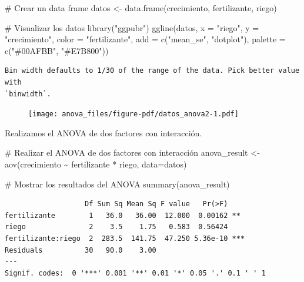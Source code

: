 \documentclass[
  letterpaper,
  DIV=11,
  numbers=noendperiod]{scrreprt}
\newenvironment{Shaded}{\begin{snugshade}}{\end{snugshade}}
\newcommand{\AttributeTok}[1]{\textcolor[rgb]{0.40,0.45,0.13}{#1}}
\newcommand{\CommentTok}[1]{\textcolor[rgb]{0.37,0.37,0.37}{#1}}
\newcommand{\FunctionTok}[1]{\textcolor[rgb]{0.28,0.35,0.67}{#1}}
\newcommand{\NormalTok}[1]{\textcolor[rgb]{0.00,0.23,0.31}{#1}}
\newcommand{\OtherTok}[1]{\textcolor[rgb]{0.00,0.23,0.31}{#1}}
\newcommand{\SpecialCharTok}[1]{\textcolor[rgb]{0.37,0.37,0.37}{#1}}
\newcommand{\StringTok}[1]{\textcolor[rgb]{0.13,0.47,0.30}{#1}}
\begin{document}
\begin{tcolorbox}
\begin{Shaded}
\begin{Highlighting}[]
\CommentTok{\# Crear un data frame}
\NormalTok{datos }\OtherTok{\textless{}{-}} \FunctionTok{data.frame}\NormalTok{(crecimiento, fertilizante, riego)}

\CommentTok{\# Visualizar los datos}
\FunctionTok{library}\NormalTok{(}\StringTok{"ggpubr"}\NormalTok{)}
\FunctionTok{ggline}\NormalTok{(datos, }\AttributeTok{x =} \StringTok{"riego"}\NormalTok{, }\AttributeTok{y =} \StringTok{"crecimiento"}\NormalTok{, }\AttributeTok{color =} \StringTok{"fertilizante"}\NormalTok{,}
       \AttributeTok{add =} \FunctionTok{c}\NormalTok{(}\StringTok{"mean\_se"}\NormalTok{, }\StringTok{"dotplot"}\NormalTok{),}
       \AttributeTok{palette =} \FunctionTok{c}\NormalTok{(}\StringTok{"\#00AFBB"}\NormalTok{, }\StringTok{"\#E7B800"}\NormalTok{))}
\end{Highlighting}
\end{Shaded}

\begin{verbatim}
Bin width defaults to 1/30 of the range of the data. Pick better value with
`binwidth`.
\end{verbatim}

\begin{figure}[H]

{\centering \texttt{[image: anova\_files/figure-pdf/datos\_anova2-1.pdf]}

}

\end{figure}

Realizamos el ANOVA de dos factores con interacción.

\begin{Shaded}
\begin{Highlighting}[]
\CommentTok{\# Realizar el ANOVA de dos factores con interacción}
\NormalTok{anova\_result }\OtherTok{\textless{}{-}} \FunctionTok{aov}\NormalTok{(crecimiento }\SpecialCharTok{\textasciitilde{}}\NormalTok{ fertilizante }\SpecialCharTok{*}\NormalTok{ riego, }\AttributeTok{data=}\NormalTok{datos)}

\CommentTok{\# Mostrar los resultados del ANOVA}
\FunctionTok{summary}\NormalTok{(anova\_result)}
\end{Highlighting}
\end{Shaded}

\begin{verbatim}
                   Df Sum Sq Mean Sq F value   Pr(>F)    
fertilizante        1   36.0   36.00  12.000  0.00162 ** 
riego               2    3.5    1.75   0.583  0.56424    
fertilizante:riego  2  283.5  141.75  47.250 5.36e-10 ***
Residuals          30   90.0    3.00                     
---
Signif. codes:  0 '***' 0.001 '**' 0.01 '*' 0.05 '.' 0.1 ' ' 1
\end{verbatim}


\end{tcolorbox}
\end{document}

